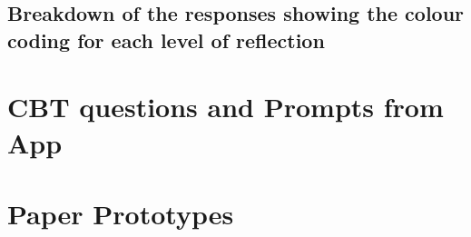 \documentclass{l4proj}
\begin{document}
\begin{appendices}
\subsection{Breakdown of the responses showing the colour coding for each level of reflection}





\section{CBT questions and Prompts from App}


\section{Paper Prototypes} \label{Appendix-PaperPrototypes}


\end{appendices}
\end{document}
